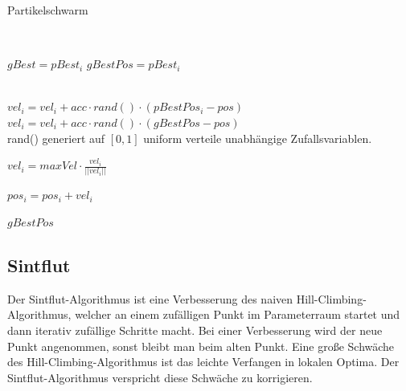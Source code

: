 \documentclass[a4paper,12pt]{article}
\begin{document}
\begin{algorithm}[H]
\caption{Partikelschwarm}
\begin{algorithmic}


 
 
\EndFor

 
\\

	
				\State $gBest = pBest_i$
				\State $gBestPos = pBest_i$
			\EndIf
		\EndIf
	
	\EndFor
	\\
		\State $vel_i = vel_i + acc \cdot rand() \cdot (pBestPos_i - pos)$
		\State $vel_i = vel_i + acc \cdot rand() \cdot (gBestPos - pos)$
		\\\Comment rand() generiert auf $[0,1]$ uniform verteile unabhängige Zufallsvariablen.
		
			\State $vel_i = maxVel \cdot \frac{vel_i}{||vel_i||}$
		\EndIf
		
		\State $pos_i = pos_i + vel_i$
	\EndFor
	
\EndFor

\Return $gBestPos$

\EndFunction
\end{algorithmic}
\end{algorithm}


%

\subsection{Sintflut \cite{dueck_1993} }

Der Sintflut-Algorithmus ist eine Verbesserung des naiven Hill-Climbing-Algorithmus, welcher an einem zufälligen Punkt im Parameterraum startet und dann iterativ zufällige Schritte macht. Bei einer Verbesserung wird der neue Punkt angenommen, sonst bleibt man beim alten Punkt. Eine große Schwäche des Hill-Climbing-Algorithmus ist das leichte Verfangen in lokalen Optima. Der Sintflut-Algorithmus verspricht diese Schwäche zu korrigieren.
\end{document}
